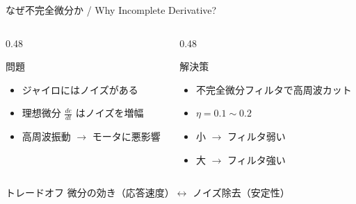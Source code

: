 \documentclass[aspectratio=169, 14pt]{beamer}
\begin{document}
\begin{frame}{なぜ不完全微分か / Why Incomplete Derivative?}
  \begin{columns}[T]
    \begin{column}{0.48\textwidth}
      \begin{alertblock}{問題}
        \begin{itemize}
          \item ジャイロにはノイズがある
          \item 理想微分 $\frac{de}{dt}$ はノイズを増幅
          \item 高周波振動 $\to$ モータに悪影響
        \end{itemize}
      \end{alertblock}
    \end{column}
    \begin{column}{0.48\textwidth}
      \begin{exampleblock}{解決策}
        \begin{itemize}
          \item 不完全微分フィルタで高周波カット
          \item $\eta = 0.1 \sim 0.2$
          \item 小 $\to$ フィルタ弱い
          \item 大 $\to$ フィルタ強い
        \end{itemize}
      \end{exampleblock}
    \end{column}
  \end{columns}

  \vspace{0.8em}

  \begin{block}{トレードオフ}
    微分の効き（応答速度）$\longleftrightarrow$ ノイズ除去（安定性）
  \end{block}
\end{frame}
\end{document}
